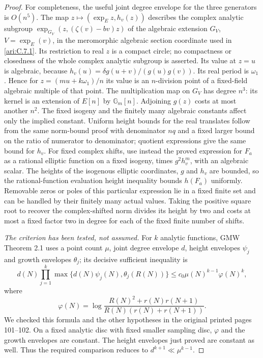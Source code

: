 \begin{proof}
For completeness, the useful joint degree envelope for the
three generators is $O(n^5)$.  The map
$z\mapsto(\exp_Ez,h_v(z))$ describes the complex analytic
subgroup $\exp_{G_V}(z,(\zeta(v)-bv)z)$ of the algebraic
extension $G_V$, $V=\exp_E(v)$, in the meromorphic algebraic
section coordinate used in \ref{ari:C.7.1}.  Its restriction to real
$z$ is a compact circle; no compactness or closedness of the
whole complex analytic subgroup is asserted.
Its value at $z=u$ is algebraic, because
$h_v(u)=\delta g(u+v)/(g(u)g(v))$.
Its real period is $\omega_1$.  Hence for
$z=(mu+k\omega_1)/n$ its value is an $n$-division point of
a fixed-field algebraic multiple of that point.
The multiplication map on $G_V$ has degree $n^3$: its kernel
is an extension of $E[n]$ by $\mathbb G_m[n]$.
Adjoining $g(z)$ costs at most another $n^2$.
The fixed isogeny and the finitely many algebraic constants
affect only the implied constant.  Uniform height bounds for
the real translates follow from the same norm-bound proof with
denominator $nq$ and a fixed larger bound on the ratio of
numerator to denominator; quotient expressions give the same
bound for $h_v$.  For fixed complex shifts, use instead the
proved expression for $F_a$ as a rational elliptic function
on a fixed isogeny, times $g^2h_v^m$, with an algebraic scalar.
The heights of the isogenous elliptic coordinates, $g$ and
$h_v$ are bounded, so the rational-function evaluation height
inequality bounds $h(F_a)$ uniformly.  Removable zeros or poles
of this particular expression lie in a fixed finite set and
can be handled by their finitely many actual values.  Taking
the positive square root to recover the complex-shifted norm
divides its height by two and costs at most a fixed factor two
in degree for each of the fixed finite number of shifts.

\emph{The criterion has been tested, not assumed.}
For $k$ analytic functions, GMW Theorem 2.1 uses a point count
$\mu$, joint degree envelope $d$, height envelopes $\psi_j$
and growth envelopes $\theta_j$; its decisive sufficient
inequality is
\[
 d(N)\prod_{j=1}^k
  \max\{d(N)\psi_j(N),\theta_j(R(N))\}
 \leq c_0\mu(N)^{k-1}\varphi(N)^k,
\]
where
\[
 \varphi(N)=\log
 \frac{R(N)^2+r(N)r(N+1)}
      {R(N)(r(N)+r(N+1))}.
\]
We checked this formula and the other hypotheses in the
original printed pages 101--102.  On a fixed analytic disc
with fixed smaller sampling disc, $\varphi$ and the growth
envelopes are constant.  The height envelopes just proved
are constant as well.  Thus the required comparison reduces
to $d^{k+1}\ll\mu^{k-1}$.


\end{proof}
